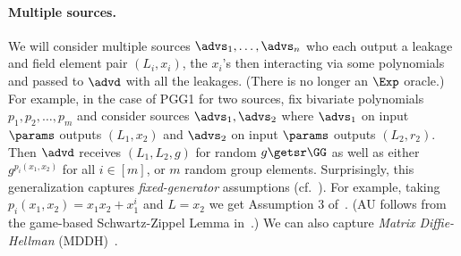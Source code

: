 {\begin{itemize}

 
\paragraph*{Multiple sources.}
We will consider multiple sources  $\advs_1, \ldots, \advs_n$ who each  output a leakage and field element pair $(L_i,x_i)$, the $x_i$'s then interacting via some polynomials and passed to $\advd$ with all the leakages.  (There is no longer an $\Exp$ oracle.) For example, in the case of PGG1 for two sources, fix bivariate polynomials $p_1,p_2,\ldots,p_m$ and consider sources $\advs_1,\advs_2$ where $\advs_1$ on input $\params$ outputs $(L_1,x_2)$ and $\advs_2$ on input $\params$ outputs $(L_2,r_2)$.  Then  $\advd$ receives $(L_1,L_2,g)$ for random $g \getsr \GG$ as well as either $g^{p_i(x_1,x_2)}$  for all $i \in [m]$, or $m$  random group elements.
Surprisingly, this generalization  captures \emph{fixed-generator} assumptions (cf.~\cite{C:BarMaZha19}).  For example, taking $p_i(x_1,x_2) = x_1 x_2 + x_1^i$ and $L=x_2$ we get Assumption 3 of~\cite{C:BarMaZha19}. (AU follows from the game-based Schwartz-Zippel Lemma in~\cite{TCC:BFHO22}.) %
We can also capture \emph{Matrix Diffie-Hellman} (MDDH)~\cite{JC:EHKRV17}.  %


\end{itemize}}
